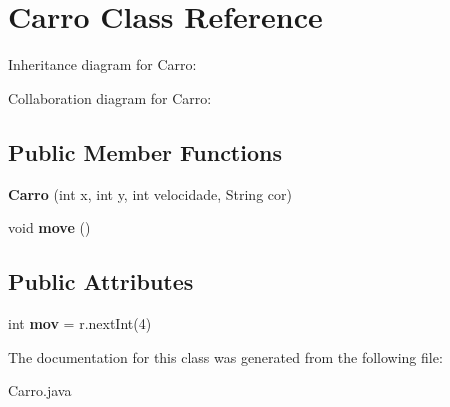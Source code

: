 \hypertarget{classCarro}{}\section{Carro Class Reference}
\label{classCarro}


Inheritance diagram for Carro\+:


Collaboration diagram for Carro\+:
\subsection*{Public Member Functions}
\begin{DoxyCompactItemize}
\item 
\mbox{\label{classCarro_a04825b53411fbe9dc67f52147d06cda0}} 
{\bfseries Carro} (int x, int y, int velocidade, String cor)
\item 
\mbox{\label{classCarro_ac1474da2f7b971afe6c865f896287d5a}} 
void {\bfseries move} ()
\end{DoxyCompactItemize}
\subsection*{Public Attributes}
\begin{DoxyCompactItemize}
\item 
\mbox{\label{classCarro_affc88d52cea6659e1d2cd57e43a12701}} 
int {\bfseries mov} = r.\+next\+Int(4)
\end{DoxyCompactItemize}


The documentation for this class was generated from the following file\+:\begin{DoxyCompactItemize}
\item 
Carro.\+java\end{DoxyCompactItemize}
